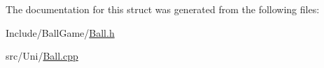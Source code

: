 The documentation for this struct was generated from the following files:\begin{DoxyCompactItemize}
\item 
Include/BallGame/\hyperlink{Ball_8h}{Ball.h}\item 
src/Uni/\hyperlink{Ball_8cpp}{Ball.cpp}\end{DoxyCompactItemize}
